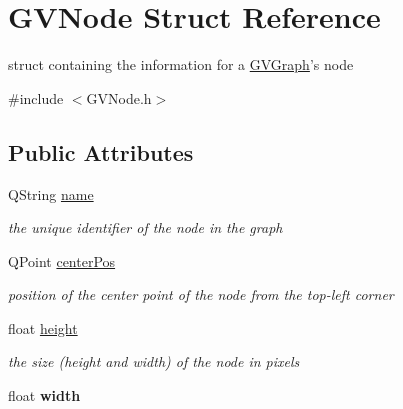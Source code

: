 \hypertarget{struct_g_v_node}{\section{\-G\-V\-Node \-Struct \-Reference}
\label{struct_g_v_node}
}


struct containing the information for a \hyperlink{class_g_v_graph}{\-G\-V\-Graph}'s node  




{\ttfamily \#include $<$\-G\-V\-Node.\-h$>$}

\subsection*{\-Public \-Attributes}
\begin{DoxyCompactItemize}
\item 
\hypertarget{struct_g_v_node_ad1af9e7c14f0b580854ad3428f1b5c9d}{\-Q\-String \hyperlink{struct_g_v_node_ad1af9e7c14f0b580854ad3428f1b5c9d}{name}}\label{struct_g_v_node_ad1af9e7c14f0b580854ad3428f1b5c9d}

\begin{DoxyCompactList}\small\item\em the unique identifier of the node in the graph \end{DoxyCompactList}\item 
\hypertarget{struct_g_v_node_a2ceb3d0e7d3f164710622acd3cbea6a6}{\-Q\-Point \hyperlink{struct_g_v_node_a2ceb3d0e7d3f164710622acd3cbea6a6}{center\-Pos}}\label{struct_g_v_node_a2ceb3d0e7d3f164710622acd3cbea6a6}

\begin{DoxyCompactList}\small\item\em position of the center point of the node from the top-\/left corner \end{DoxyCompactList}\item 
\hypertarget{struct_g_v_node_a498e3f749e2228709a3987ac11512c82}{float \hyperlink{struct_g_v_node_a498e3f749e2228709a3987ac11512c82}{height}}\label{struct_g_v_node_a498e3f749e2228709a3987ac11512c82}

\begin{DoxyCompactList}\small\item\em the size (height and width) of the node in pixels \end{DoxyCompactList}\item 
\hypertarget{struct_g_v_node_adc1d840d0813610c08420ce97195b893}{float {\bfseries width}}\label{struct_g_v_node_adc1d840d0813610c08420ce97195b893}

\end{DoxyCompactItemize}


